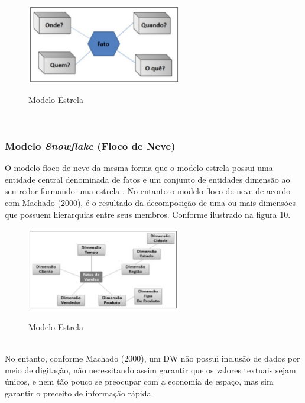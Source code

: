 \begin{figure}[H]
	\vspace*{0,2cm}
    \centering
    \caption{Modelo Estrela}
    \includegraphics[width=0.6\textwidth]{./04-figuras/figura-09}
    \label{fig:ilustfig09}
\end{figure}
\vspace*{-0,9cm}
{\raggedright {}} \\

\subsubsection{Modelo \textit{Snowflake} (Floco de Neve)}

O modelo floco de neve da mesma forma que o modelo estrela possui uma entidade central denominada de fatos e um conjunto de entidades dimensão ao seu redor formando uma estrela
.
No entanto o modelo floco de neve de acordo com Machado (2000), é o resultado da decomposição de uma ou mais dimensões que possuem hierarquias entre seus membros. Conforme ilustrado na figura 10.
	
\begin{figure}[H]
	\vspace*{0,2cm}
    \centering
    \caption{Modelo Estrela}
    \includegraphics[width=0.6\textwidth]{./04-figuras/figura-10}
    \label{fig:ilustfig10}
\end{figure}
\vspace*{-0,9cm}
{\raggedright {}} \\

No entanto, conforme Machado (2000), um DW não possui inclusão de dados por meio de digitação, não necessitando assim garantir que os valores textuais sejam únicos, e nem tão pouco se preocupar com a economia de espaço, mas sim garantir o preceito de informação rápida.


